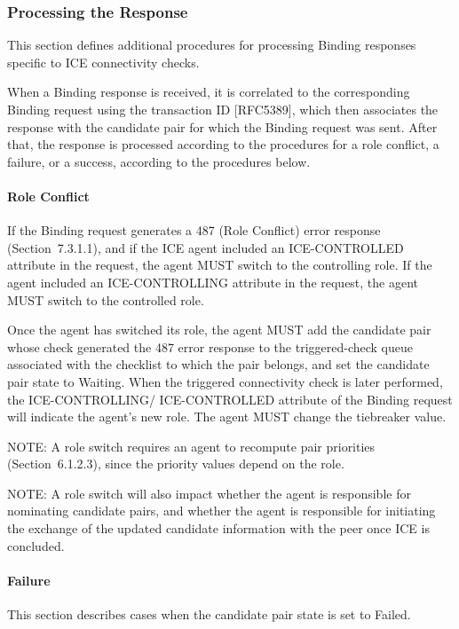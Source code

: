 \documentclass{article}
\begin{document}
\subsubsection{Processing the Response}

This section defines additional procedures for processing Binding responses specific to ICE connectivity checks.

When a Binding response is received, it is correlated to the corresponding Binding request using the transaction ID [RFC5389], which then associates the response with the candidate pair for which the Binding request was sent.  After that, the response is processed according to the procedures for a role conflict, a failure, or a success, according to the procedures below.

\paragraph{Role Conflict}

If the Binding request generates a 487 (Role Conflict) error response (Section~7.3.1.1), and if the ICE agent included an ICE-CONTROLLED attribute in the request, the agent MUST switch to the controlling role.  If the agent included an ICE-CONTROLLING attribute in the request, the agent MUST switch to the controlled role.

Once the agent has switched its role, the agent MUST add the candidate pair whose check generated the 487 error response to the triggered-check queue associated with the checklist to which the pair belongs, and set the candidate pair state to Waiting.  When the triggered connectivity check is later performed, the ICE-CONTROLLING/ ICE-CONTROLLED attribute of the Binding request will indicate the agent's new role.  The agent MUST change the tiebreaker value.

NOTE: A role switch requires an agent to recompute pair priorities (Section~6.1.2.3), since the priority values depend on the role.

NOTE: A role switch will also impact whether the agent is responsible for nominating candidate pairs, and whether the agent is responsible for initiating the exchange of the updated candidate information with the peer once ICE is concluded.

\paragraph{Failure}

This section describes cases when the candidate pair state is set to Failed.
\end{document}
